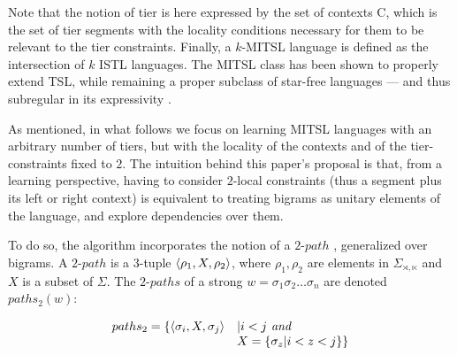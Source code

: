 \documentclass[11pt,a4paper]{article}
\begin{document}
Note that the notion of tier is here expressed by the set of contexts C, which is the set of tier segments with the locality conditions necessary for them to be relevant to the tier constraints.
Finally, a $k$-MITSL language is defined as the intersection of $k$ ISTL languages.
The MITSL class has been shown to properly extend TSL, while remaining a proper subclass of star-free languages --- and thus subregular in its expressivity \cite{desanto2019structure}.


As mentioned, in what follows we focus on learning MITSL languages with an arbitrary number of tiers, but with the locality of the contexts and of the tier-constraints fixed to $2$.
The intuition behind this paper's proposal is that, from a learning perspective, having to consider $2$-local constraints (thus a segment plus its left or right context) is equivalent to treating bigrams as unitary elements of the language, and explore dependencies over them.

To do so, the algorithm incorporates the notion of a $2\text{-}path$ \citep{JardineHeinz16}, generalized over bigrams.
A $2\text{-}path$ is a $3$-tuple $\langle{\rho_1, X, \rho_2}\rangle$, where $\rho_1, \rho_2$  are elements in $\Sigma_{\rtimes,\ltimes}$ and $X$ is a subset of $\Sigma$.
The $2\text{-}paths$ of a strong $w = \sigma_1\sigma_2\dots\sigma_n$ are denoted $paths_2(w)$:

$$
  \begin{array}{ll}
  paths_2= \{ \langle{\sigma_i,X,\sigma_j}\rangle & |  i < j  \textit{ and}\\
   & X = \{ \sigma_z | i < z<j\} \}
    \end{array}
$$
\end{document}
